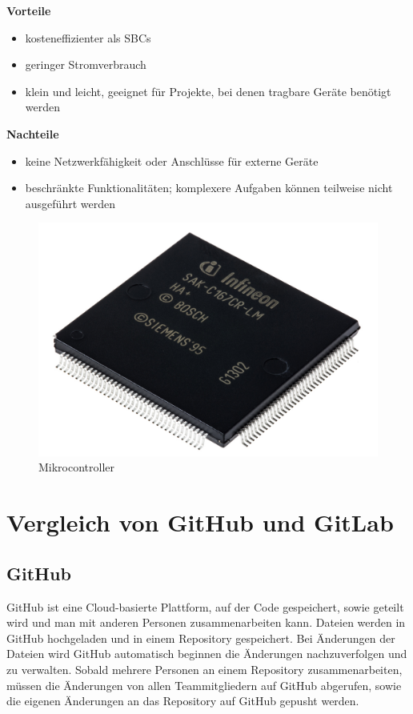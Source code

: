\textbf{Vorteile}
\begin{itemize}
	\item kosteneffizienter als SBCs
	\item geringer Stromverbrauch
	\item klein und leicht, geeignet für Projekte, bei denen tragbare Geräte benötigt werden 
\end{itemize}

\textbf{Nachteile}
\begin{itemize}
	\item keine Netzwerkfähigkeit oder Anschlüsse für externe Geräte
	\item beschränkte Funktionalitäten; komplexere Aufgaben können teilweise nicht ausgeführt werden
\end{itemize}

\begin{figure}[H]
	\centering
	\includegraphics[width=0.7\linewidth]{images/Mikrocontroller.jpg}
	\caption[Mikrocontroller]{Mikrocontroller}
	\label{fig:Mikrocontroller}
\end{figure}

\newpage
\section{Vergleich von GitHub und GitLab}
\subsection{GitHub}
GitHub ist eine Cloud-basierte Plattform, auf der Code gespeichert, sowie geteilt wird und man mit anderen Personen zusammenarbeiten kann. Dateien werden in GitHub hochgeladen und in einem Repository gespeichert. Bei Änderungen der Dateien wird GitHub automatisch beginnen die Änderungen nachzuverfolgen und zu verwalten. Sobald mehrere Personen an einem Repository zusammenarbeiten, müssen die Änderungen von allen Teammitgliedern auf GitHub abgerufen, sowie die eigenen Änderungen an das Repository auf GitHub gepusht werden. \parencite{GitHubUndGit}

